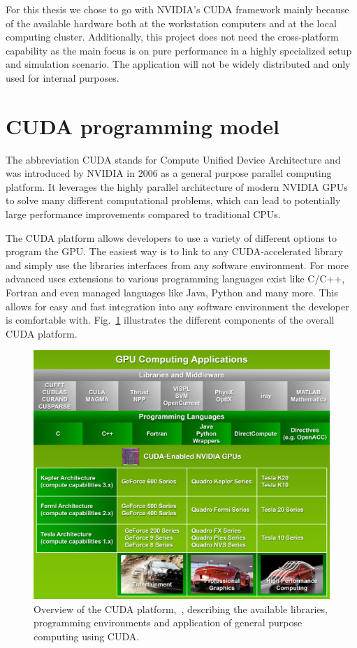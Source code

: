 For this thesis we chose to go with NVIDIA's CUDA framework mainly because of the available hardware both at the workstation computers and at the local computing cluster. Additionally, this project does not need the cross-platform capability as the main focus is on pure performance in a highly specialized setup and simulation scenario. The application will not be widely distributed and only used for internal purposes.

\section{CUDA programming model}
\label{sec:CUDA}
The abbreviation CUDA stands for Compute Unified Device Architecture and was introduced by NVIDIA in 2006 as a general purpose parallel computing platform. It leverages the highly parallel architecture of modern NVIDIA GPUs to solve many different computational problems, which can lead to potentially large performance improvements compared to traditional CPUs.

The CUDA platform allows developers to use a variety of different options to program the GPU. The easiest way is to link to any CUDA-accelerated library and simply use the libraries interfaces from any software environment. For more advanced uses extensions to various programming languages exist like C/C++, Fortran and even managed languages like Java, Python and many more. This allows for easy and fast integration into any software environment the developer is comfortable with. Fig.~\ref{fig:cuda_overview} illustrates the different components of the overall CUDA platform.

\begin{figure}[!htbp]
  \centering
  \includegraphics[width=.9\textwidth]{img/cuda_overview.jpg}
  \caption[Overview of the CUDA platform.]{Overview of the CUDA platform,~\cite{CudaProgrammingGuide}, describing the available libraries, programming environments and application of general purpose computing using CUDA.}
  \label{fig:cuda_overview}
\end{figure}

